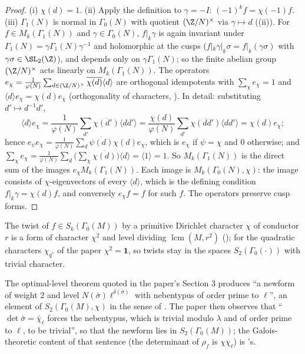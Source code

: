 \begin{proof}
(i) $\chi(d)=1$. (ii) Apply the definition to $\gamma=-I$: $(-1)^kf=\chi(-1)f$. (iii) $\Gamma_1(N)$ is normal in $\Gamma_0(N)$ with quotient $(\Z/N)^\times$ via $\gamma\mapsto d$
((ii)). For $f\in M_k(\Gamma_1(N))$ and $\gamma\in\Gamma_0(N)$, $f|_k\gamma$ is again invariant under $\Gamma_1(N)=\gamma\Gamma_1(N)\gamma^{-1}$ and holomorphic at the cusps
($f|_k\gamma|_k\sigma=f|_k(\gamma\sigma)$ with $\gamma\sigma\in\SL_2(\Z)$), and depends only on $\gamma\Gamma_1(N)$; so the finite abelian group $(\Z/N)^\times$ acts linearly on
$M_k(\Gamma_1(N))$. The operators $e_\chi=\frac1{\varphi(N)}\sum_{d\in(\Z/N)^\times}\overline{\chi(d)}\langle d\rangle$ are orthogonal idempotents with $\sum_\chi e_\chi=1$ and
$\langle d\rangle e_\chi=\chi(d)e_\chi$ (orthogonality of characters, ). In detail: substituting $d'\mapsto d^{-1}d'$,
\[
\langle d\rangle e_\chi=\frac1{\varphi(N)}\sum_{d'}\overline{\chi(d')}\langle dd'\rangle=\frac{\chi(d)}{\varphi(N)}\sum_{d'}\overline{\chi(dd')}\langle dd'\rangle=\chi(d)e_\chi ;
\]
hence $e_\psi e_\chi=\frac1{\varphi(N)}\sum_d\overline{\psi(d)}\chi(d)e_\chi$, which is $e_\chi$ if $\psi=\chi$ and $0$ otherwise; and $\sum_\chi e_\chi=\frac1{\varphi(N)}\sum_d\bigl(\sum_\chi\overline{\chi(d)}\bigr)\langle d\rangle=\langle1\rangle=1$.
So $M_k(\Gamma_1(N))$ is the direct sum of the images $e_\chi M_k(\Gamma_1(N))$. Each image is $M_k(\Gamma_0(N),\chi)$: the image consists of $\chi$-eigenvectors of every $\langle d\rangle$, which is
the defining condition $f|_k\gamma=\chi(d)f$, and conversely $e_\chi f=f$ for such $f$. The operators preserve cusp forms.
\end{proof}

The twist of $f\in S_k(\Gamma_0(M))$ by a primitive Dirichlet character $\chi$ of conductor $r$ is a form of character $\chi^2$ and level dividing $\operatorname{lcm}(M,r^2)$
(); for the quadratic characters $\chi_{q^*}$ of the paper $\chi^2=\mathbf 1$, so twists stay in the spaces $S_2(\Gamma_0(\cdot))$ with trivial character.

\begin{paperlink}\label{pl:modforms:nebentypus}
The optimal-level theorem quoted in the paper's Section 3 produces ``a newform of weight $2$ and level $N(\bar\sigma)\ell^{\delta(\bar\sigma)}$ with nebentypus of order prime
to $\ell$'', an element of $S_2(\Gamma_0(M),\chi)$ in the sense of . The paper then observes that ``$\det\bar\sigma=\bar\chi_\ell$ forces the
nebentypus, which is trivial modulo $\lambda$ and of order prime to $\ell$, to be trivial'', so that the newform lies in $S_2(\Gamma_0(M))$; the Galois-theoretic content of
that sentence (the determinant of $\rho_f$ is $\chi\chi_\ell$) is 's.
\end{paperlink}

